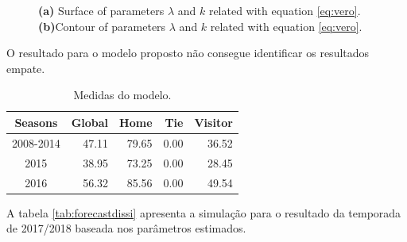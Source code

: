 \documentclass[doc,apacite,oneside,a4paper,12pt]{apa6}
\begin{document}
\begin{figure}%
    \centering
    \qquad
    \caption[\scriptsize{Tunning parameters.}]{\scriptsize{ \textbf{(a)} Surface of parameters $\lambda$ and $k$ related with equation \ref{eq:vero}.\textbf{(b)}Contour of parameters $\lambda$ and $k$ related with equation \ref{eq:vero}.}}
    \label{fig:tunning}%
\end{figure}


O resultado para o modelo proposto não consegue identificar os resultados empate.

\begin{table}[ht]
\centering
\begin{tabular}{crrrr}
  \hline
Seasons & Global & Home & Tie & Visitor \\ 
  \hline
2008-2014 & 47.11 & 79.65 & 0.00 & 36.52 \\ 
  2015 & 38.95 & 73.25 & 0.00 & 28.45 \\ 
  2016 & 56.32 & 85.56 & 0.00 & 49.54 \\ 
   \hline
\end{tabular}
    \caption[\scriptsize{Medidas do modelo.}]{\scriptsize{Medidas do modelo.}}
    \label{tab:medidasmod}
\end{table}


A tabela \ref{tab:forecastdissi} apresenta a simulação para o resultado da temporada de 2017/2018 baseada nos parâmetros estimados.
\end{document}
